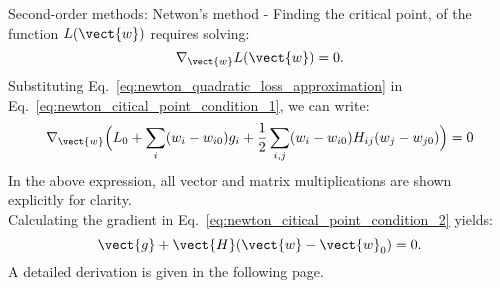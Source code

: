 \begin{frame}[t,allowframebreaks]{
    Second-order methods: Netwon's method -}
    Finding the \gls{critical point}, 
    of the function $L(\vect{w})$ requires solving:
    \begin{equation}
        \nabla_{\vect{w}} L(\vect{w}) = 0. 
        \label{eq:newton_citical_point_condition_1}    
    \end{equation}
    Substituting Eq.~\ref{eq:newton_quadratic_loss_approximation}
    in Eq.~\ref{eq:newton_citical_point_condition_1}, we can write:
    \begin{equation}
        \nabla_{\vect{w}} \Big( 
            L_0 + 
            \sum_{i} (w_{i} - w_{i0}) g_{i} +
            \frac{1}{2} \sum_{i,j} (w_{i} - w_{i0}) H_{ij} (w_j - w_{j0})
        \Big) = 0 
        \label{eq:newton_citical_point_condition_2}    
    \end{equation}
    In the above expression, all vector and matrix multiplications
    are shown explicitly for clarity.\\
    \vspace{0.2cm}
    Calculating the \gls{gradient} 
    in Eq.~\ref{eq:newton_citical_point_condition_2} yields:
    \begin{equation}
        \vect{g} + \vect{H} (\vect{w} - \vect{w}_{0}) = 0.
        \label{eq:newton_gradient_of_quadratic_loss}    
    \end{equation}
    \vspace{0.2cm}
    A detailed derivation is given in the following page.\\


    \framebreak
 


\end{frame}
